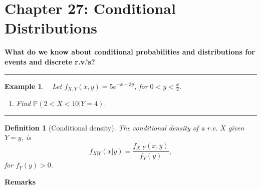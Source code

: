 \documentclass[12pt]{amsart}
\newtheorem{definition}[theorem]{Definition}
\newtheorem{example}[theorem]{Example}
\newcommand\Pbb{\mathbb{P}}
\newcommand\pdfY{f_Y(y)}
\newcommand\pdfXY{f_{X,Y}(x,y)}
\newcommand\pdfXgY{f_{X|Y}(x|y)}
\begin{document}
\setcounter{section}{27}
{\huge  
\section*{Chapter 27: Conditional Distributions}
}

{\large %




\vspace{.5cm}


\textbf{What do we know about conditional probabilities and distributions for events and discrete r.v.'s?}

\vspace{5cm}
\hrule
\vspace{.5cm}

\begin{example}\label{27_Ex_1}\ \newline
Let $\pdfXY = 5 e^{-x-3y}$, for $0 < y < \frac{x}{2}$. 
\begin{enumerate}
\item Find $\Pbb(2<X<10|Y=4)$.
\end{enumerate}
\end{example}




\vspace{6cm}
\hrule
\vspace{.5cm}

\begin{definition}[Conditional density]
The conditional density of a r.v. $X$ given $Y=y$, is
$$
\pdfXgY = \frac{\pdfXY}{\pdfY},
$$
for $\pdfY > 0$.
\end{definition}


\vspace{.3cm}
\textbf{Remarks}

}
\end{document}
